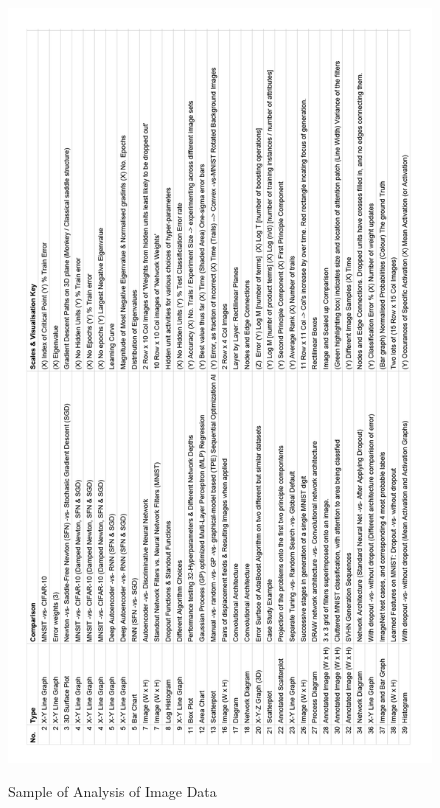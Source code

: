 \documentclass[a4paper,11pt,titlepage]{article}
\begin{document}
		
		\begin{figure}[H]
    			\centering	
		{{\includegraphics[width=14cm]
    				{img/exploration_data_rotate} 
    			}}%
    			\caption{Sample of Analysis of Image Data}%
    		\label{fig:studentprofile}
		\end{figure}
		
		\clearpage
\end{document}
